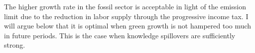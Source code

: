 The higher growth rate in the fossil sector is acceptable in light of the emission limit due to the reduction in labor supply through the progressive income tax. I will argue below that it is optimal when green growth is not hampered too much in future periods. This is the case when knowledge spillovers are sufficiently strong. 






